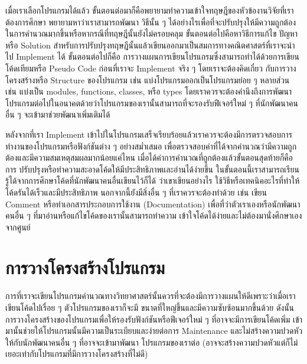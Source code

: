 เมื่อเราเลือกโปรแกรมได้แล้ว ขั้นตอนต่อมาก็คือพยายามทำความเข้าใจทฤษฎีของหัวข้องานวิจัยที่เราต้องการศึกษา พยายามหาว่าเราสามารถพัฒนา%
วิธีนั้น ๆ ได้อย่างไรเพื่อที่จะปรับปรุงให้มีความถูกต้องในการคำนวณมากขึ้นหรือหากรณีที่ทฤษฎีนั้นยังไม่ครอบคลุม ขั้นตอนต่อไปคือหาวิธีการแก้ไข%
ปัญหาหรือ Solution สำหรับการปรับปรุงทฤษฎีนั้นแล้วเขียนออกมาเป็นสมการทางคณิตศาสตร์ที่เราจะนำไป Implement ได้ ขั้นตอนต่อไปก็คือ%
การวางแผนการเขียนโปรแกรมซึ่งสามารถทำได้ด้วยการเขียนโค้ดเทียมหรือ Pseudo Code ก่อนที่เราจะ Implement จริง ๆ โดยเราจะต้องคิดเกี่ยว%
กับการวางโครงสร้างหรือ Structure ของโปรแกรม เช่น แบ่งโปรแกรมออกเป็นโปรแกรมย่อย ๆ หลายส่วน เช่น แบ่งเป็น modules, functions, 
classes, หรือ types โดยเราควรจะต้องคำนึงถึงการพัฒนาโปรแกรมต่อไปในอนาคตด้วยว่าโปรแกรมของเรานั้นสามารถที่จะรองรับฟีเจอร์ใหม่ ๆ 
ที่นักพัฒนาคนอื่น ๆ จะเข้ามาช่วยพัฒนาเพิ่มเติมได้

หลังจากที่เรา Implement เข้าไปในโปรแกรมเสร็จเรียบร้อยแล้วเราควรจะต้องมีการตรวจสอบการทำงานของโปรแกรมหรือฟังก์ชันต่าง ๆ อย่างสม่ำเสมอ%
เพื่อตรวจสอบค่าที่ได้จากคำนวณว่ามีความถูกต้องและมีความสมเหตุสมผลมากน้อยแค่ไหน เมื่อได้ค่าการคำนวณที่ถูกต้องแล้วขั้นตอนสุดท้ายก็คือการ%
ปรับปรุงหรือทำความสะอาดโค้ดให้มีประสิทธิภาพและอ่านได้ง่ายขึ้น ในขั้นตอนนี้เราสามารถเรียนรู้ได้จากการศึกษาโค้ดที่นักพัฒนาคนอื่นเขียนไว้ก็ได้%
ว่าเขาเขียนอย่างไร ใช้วิธีหรือเทคนิคอะไรที่ทำให้โค้ดรันได้เร็วและมีประสิทธิภาพ นอกจากนี้ยังมีสิ่งอื่น ๆ ที่เราควรจะต้องทำด้วย เช่น เขียน Comment 
หรือทำเอกสารประกอบการใช้งาน (Documentation) เพื่อที่ว่าตัวเราเองหรือนักพัฒนาคนอื่น ๆ ที่มาอ่านหรือแก้ไขโค้ดของเรานั้นสามารถทำความ%
เข้าใจโค้ดได้ง่ายและไม่ต้องมานั่งศึกษาเองจากศูนย์

\section{การวางโครงสร้างโปรแกรม}

การที่เราจะเขียนโปรแกรมคำนวณทางวิทยาศาสตร์นั้นควรที่จะต้องมีการวางแผนให้ดีเพราะว่าเมื่อเราเขียนโค้ดไปเรื่อย ๆ ตัวโปรแกรมของเราก็จะมี%
ขนาดที่ใหญ่ขึ้นและมีความซับซ้อนมากขึ้นด้วย ดังนั้นการวางโครงสร้างของโปรแกรมเพื่อให้รองรับฟังก์ชันหรือฟีเจอร์ใหม่ ๆ ที่อาจจะมีการเขียนโค้ดเพิ่ม%
เข้ามานั้นช่วยให้โปรแกรมนั้นมีความเป็นระเบียบและง่ายต่อการ Maintenance และไม่สร้างความปวดหัวให้กับนักพัฒนาคนอื่น ๆ ที่อาจจะเข้ามาพัฒนา%
โปรแกรมของเราต่อ (อาจจะสร้างความปวดหัวแต่ก็ไม่เยอะเท่ากับโปรแกรมที่มีการวางโครงสร้างที่ไม่ดี) 

